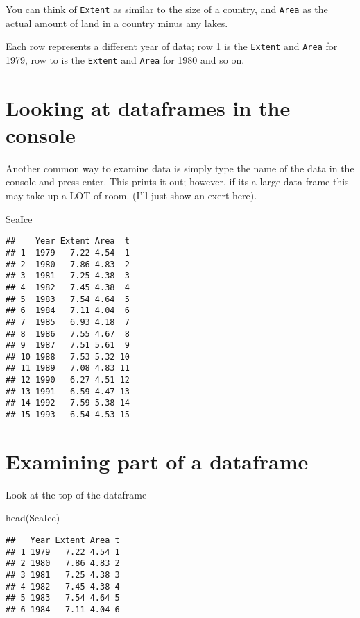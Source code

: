 \documentclass[
]{book}
\newenvironment{Shaded}{\begin{snugshade}}{\end{snugshade}}
\newcommand{\FunctionTok}[1]{\textcolor[rgb]{0.00,0.00,0.00}{#1}}
\newcommand{\NormalTok}[1]{#1}
\begin{document}
You can think of \texttt{Extent} as similar to the size of a country, and \texttt{Area} as the actual amount of land in a country minus any lakes.

Each row represents a different year of data; row 1 is the \texttt{Extent} and \texttt{Area} for 1979, row to is the \texttt{Extent} and \texttt{Area} for 1980 and so on.

\hypertarget{looking-at-dataframes-in-the-console}{%
\section{Looking at dataframes in the console}\label{looking-at-dataframes-in-the-console}}

Another common way to examine data is simply type the name of the data in the console and press enter. This prints it out; however, if its a large data frame this may take up a LOT of room. (I'll just show an exert here).

\begin{Shaded}
\begin{Highlighting}[]
\NormalTok{SeaIce}
\end{Highlighting}
\end{Shaded}

\begin{verbatim}
##    Year Extent Area  t
## 1  1979   7.22 4.54  1
## 2  1980   7.86 4.83  2
## 3  1981   7.25 4.38  3
## 4  1982   7.45 4.38  4
## 5  1983   7.54 4.64  5
## 6  1984   7.11 4.04  6
## 7  1985   6.93 4.18  7
## 8  1986   7.55 4.67  8
## 9  1987   7.51 5.61  9
## 10 1988   7.53 5.32 10
## 11 1989   7.08 4.83 11
## 12 1990   6.27 4.51 12
## 13 1991   6.59 4.47 13
## 14 1992   7.59 5.38 14
## 15 1993   6.54 4.53 15
\end{verbatim}

\hypertarget{examining-part-of-a-dataframe}{%
\section{Examining part of a dataframe}\label{examining-part-of-a-dataframe}}

Look at the top of the dataframe

\begin{Shaded}
\begin{Highlighting}[]
\FunctionTok{head}\NormalTok{(SeaIce)}
\end{Highlighting}
\end{Shaded}

\begin{verbatim}
##   Year Extent Area t
## 1 1979   7.22 4.54 1
## 2 1980   7.86 4.83 2
## 3 1981   7.25 4.38 3
## 4 1982   7.45 4.38 4
## 5 1983   7.54 4.64 5
## 6 1984   7.11 4.04 6
\end{verbatim}
\end{document}
